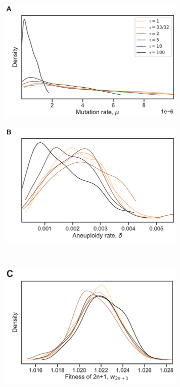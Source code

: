 \documentclass[12pt]{extarticle}
\begin{document}
\begin{figure}[h!]
  \centering
  \begin{subfigure}{0.45\textwidth}
      \includegraphics[width=\textwidth]{../figures/tau-A.pdf}      
  \end{subfigure}
  \begin{subfigure}{0.45\textwidth}
      \includegraphics[width=\textwidth]{../figures/tau-B.pdf}      
  \end{subfigure}
  \\
   \begin{subfigure}{0.325\textwidth}
      \includegraphics[width=\textwidth]{../figures/tau-C.pdf}      

\end{subfigure}
\end{figure}
\end{document}
